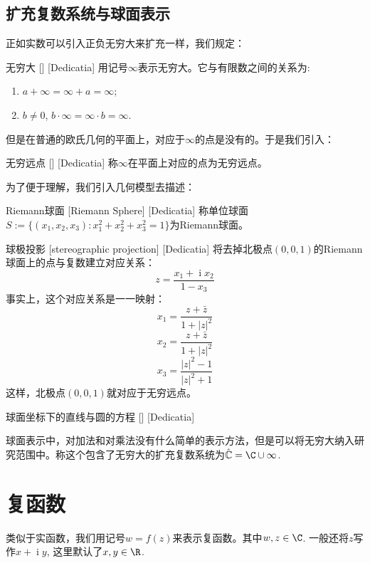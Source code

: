 \documentclass[UTF8]{ctexart}
\DeclareMathOperator{\ii}{\mathrm{i}}
\begin{document}
\subsection{扩充复数系统与球面表示}
正如实数可以引入正负无穷大来扩充一样，我们规定：
\begin{dfn}
    [UUID]
    {无穷大}
    []
    [Dedicatia]
    用记号$\infty$表示无穷大。它与有限数之间的关系为:
    \begin{enumerate}
        \item $a+\infty=\infty+a=\infty$;
        \item $b\neq 0$, $b\cdot\infty=\infty\cdot b=\infty$.
    \end{enumerate}
\end{dfn}
但是在普通的欧氏几何的平面上，对应于$\infty$的点是没有的。于是我们引入：
\begin{dfn}
    [UUID]
    {无穷远点}
    []
    [Dedicatia]
    称$\infty$在平面上对应的点为无穷远点。
\end{dfn}
为了便于理解，我们引入几何模型去描述：
\begin{dfn}
    [UUID]
    {Riemann球面}
    [Riemann Sphere]
    [Dedicatia]
    称单位球面$S:=\{(x_1,x_2,x_3):x_1^2+x_2^2+x_3^2=1\}$为Riemann球面。
\end{dfn}
\begin{ppt}
    [UUID]
    {球极投影}
    [stereographic projection]
    [Dedicatia]
    将去掉北极点$(0,0,1)$的Riemann球面上的点与复数建立对应关系：
    \[z=\frac{x_1+\ii x_2}{1-x_3}\]
    事实上，这个对应关系是一一映射：
    \[x_1=\frac{z+\bar{z}}{1+|z|^2}\]
    \[x_2=\frac{z+\bar{z}}{1+|z|^2}\]
    \[x_3=\frac{|z|^2-1}{|z|^2+1}\]
    这样，北极点$(0,0,1)$就对应于无穷远点。
\end{ppt}
\begin{ppt}
    [UUID]
    {球面坐标下的直线与圆的方程}
    []
    [Dedicatia]
\end{ppt}
球面表示中，对加法和对乘法没有什么简单的表示方法，但是可以将无穷大纳入研究范围中。称这个包含了无穷大的扩充复数系统为$\hat{\mathbb{C}}=\C\cup\infty $.
\section{复函数}
类似于实函数，我们用记号$w=f(z)$来表示复函数。其中$w,z\in\C$. 一般还将$z$写作$x+\ii y$, 这里默认了$x,y\in\R$. 
\end{document}
